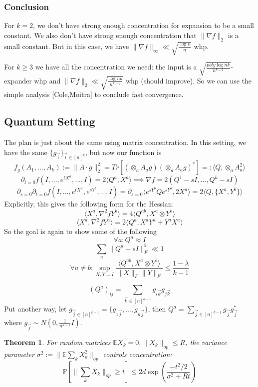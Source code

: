 \documentclass{article}
\newtheorem{theorem}{Theorem}
\newcommand{\E}{\mathbb{E}}
\renewcommand{\Pr}{\mathbb{P}}
\begin{document}
\subsubsection{Conclusion}
For $k=2$, we don't have strong enough concentration for expansion to be a small constant. We also don't have strong enough concentration that $\|\nabla f\|_{2}$ is a small constant. But in this case, we have $\|\nabla f\|_{\infty} \ll \sqrt{\frac{\log n}{n}}$ whp. 

For $k \geq 3$ we have all the concentration we need: the input is a $\sqrt{\frac{poly\log nk}{n^{k-1}}}$-expander whp and $\|\nabla f\|_{2} \ll \sqrt{\frac{\log nk}{n^{k-2}}}$ whp (should improve). So we can use the simple analysis [Cole,Moitra] to conclude fast convergence. 


\subsection{Quantum Setting}
The plan is just about the same using matrix concentration. In this setting, we have the same $\{g_{\vec{i}}\}_{\vec{i} \in [n]^{k}}$, but now our function is
\[ f_{g}(A_{1}, ..., A_{k}) := \|A \cdot g\|_{2}^{2} = Tr[ ( \otimes_{a} A_{a} g) ( \otimes_{a} A_{a} g)^{*} ] =: \langle Q, \otimes_{a} A_{a}^{2} \rangle   \]
\[ \partial_{t=0} f(I, ...,e^{tX^{a}}, ..., I) = 2 \langle Q^{a}, X^{a} \rangle \implies \nabla f = 2 (Q^{1} - sI, ..., Q^{k} - sI)    \]
\[ \partial_{s=0} \partial_{t=0} f(I, ..., e^{tX^{a}}, e^{sY^{b}}, ..., I) = \partial_{s=0} \langle e^{sY^{b}} Q e^{sY^{b}}, 2 X^{a} \rangle = 2 \langle Q, \{X^{a}, Y^{b}\} \rangle   \]
Explicitly, this gives the following form for the Hessian:
\[ \langle X^{a}, \nabla^{2} f Y^{b} \rangle = 4 \langle Q^{ab}, X^{a} \otimes Y^{b} \rangle   \]
\[ \langle X^{a}, \nabla^{2} f Y^{a} \rangle = 2 \langle Q^{a}, X^{a} Y^{a} + Y^{a} X^{a} \rangle  \]
So the goal is again to show some of the following
\[ \forall a: Q^{a} \approx I  \]
\[ \sum_{a} \|Q^{a} - sI\|_{F}^{2} \ll 1   \]
\[ \forall a \neq b: \sup_{X,Y \perp I} \frac{\langle Q^{ab}, X^{a} \otimes Y^{b} \rangle}{\|X\|_{F} \|Y\|_{F}} \leq \frac{1 - \lambda}{k-1}   \]

\[ (Q^{a})_{ij} = \sum_{\vec{k} \in [n]^{k-1}} g_{i\vec{k}} g_{j \vec{k}}  \]
Put another way, let $g_{\vec{j} \in [n]^{k-1}} = \{g_{1 \vec{j}}, ..., g_{n \vec{j}}\}$, then $Q^{a} = \sum_{\vec{j} \in [n]^{k-1}} g_{\vec{j}} g_{\vec{j}}^{*}$ where $g_{\vec{j}} \sim N(0,\frac{1}{n^{k-1}} I)$. 

\begin{theorem}
For random matrices $\E X_{k} = 0, \|X_{k}\|_{op} \leq R$, the variance parameter $\sigma^{2} := \|\E \sum_{k} X_{k}^{2} \|_{op}$ controls concentration:
\[ \Pr [ \|\sum_{k} X_{k}\|_{op} \geq t ] \leq 2 d \exp \left( \frac{-t^{2}/2}{\sigma^{2} + Rt} \right)   \]
\end{theorem}
\end{document}

